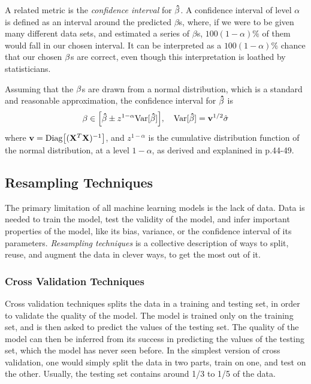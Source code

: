 \documentclass[10pt, twocolumn]{article}
\begin{document}
A related metric is the \textit{confidence interval} for $\vb{\hat{\beta}}$. A confidence interval of level $\alpha$ is defined as an interval around the predicted $\beta$s, where, if we were to be given many different data sets, and estimated a series of $\beta$s, $100(1-\alpha)\%$ of them would fall in our chosen interval. It can be interpreted as a $100(1-\alpha)\%$ chance that our chosen $\vb{\beta}$s are correct, even though this interpretation is loathed by statisticians.

Assuming that the $\vb{\beta}$s are drawn from a normal distribution, which is a standard and reasonable approximation, the confidence interval for $\vb{\hat{\beta}}$ is
\begin{align}
    \vb{\beta} \in \qty[\vb{\hat{\beta}} \pm z^{1-\alpha}\mathrm{Var}[\vb{\hat{\beta}}]], \quad \mathrm{Var}[\vb{\hat{\beta}}] = \vb{v}^{1/2}\hat{\sigma}
\end{align}
where $\vb{v} = \mathrm{Diag}\qty[(\vb{X}^T\vb{X})^{-1}]$, and $z^{1-\alpha}$ is the cumulative distribution function of the normal distribution, at a level $1-\alpha$, as derived and explanined in \citep{ESL} p.44-49.




\subsection{Resampling Techniques}
The primary limitation of all machine learning models is the lack of data. Data is needed to train the model, test the validity of the model, and infer important properties of the model, like its bias, variance, or the confidence interval of its parameters. \textit{Resampling techniques} is a collective description of ways to split, reuse, and augment the data in clever ways, to get the most out of it.

\subsubsection{Cross Validation Techniques}
Cross validation techniques splits the data in a training and testing set, in order to validate the quality of the model. The model is trained only on the training set, and is then asked to predict the values of the testing set. The quality of the model can then be inferred from its success in predicting the values of the testing set, which the model has never seen before. In the simplest version of cross validation, one would simply split the data in two parts, train on one, and test on the other. Usually, the testing set contains around 1/3 to 1/5 of the data.
\end{document}
